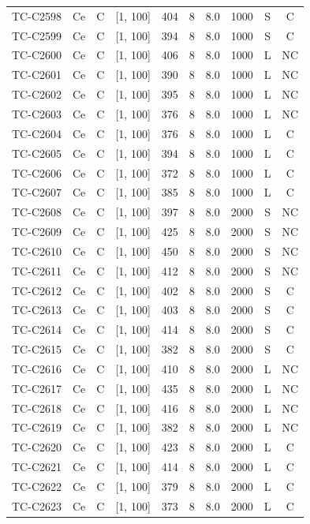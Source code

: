 \begin{longtable}{lccccccccc}
TC-C2598 & Ce & C & [1, 100] & 404 & 8 & 8.0 & 1000 & S & C \\
TC-C2599 & Ce & C & [1, 100] & 394 & 8 & 8.0 & 1000 & S & C \\
TC-C2600 & Ce & C & [1, 100] & 406 & 8 & 8.0 & 1000 & L & NC \\
TC-C2601 & Ce & C & [1, 100] & 390 & 8 & 8.0 & 1000 & L & NC \\
TC-C2602 & Ce & C & [1, 100] & 395 & 8 & 8.0 & 1000 & L & NC \\
TC-C2603 & Ce & C & [1, 100] & 376 & 8 & 8.0 & 1000 & L & NC \\
TC-C2604 & Ce & C & [1, 100] & 376 & 8 & 8.0 & 1000 & L & C \\
TC-C2605 & Ce & C & [1, 100] & 394 & 8 & 8.0 & 1000 & L & C \\
TC-C2606 & Ce & C & [1, 100] & 372 & 8 & 8.0 & 1000 & L & C \\
TC-C2607 & Ce & C & [1, 100] & 385 & 8 & 8.0 & 1000 & L & C \\
TC-C2608 & Ce & C & [1, 100] & 397 & 8 & 8.0 & 2000 & S & NC \\
TC-C2609 & Ce & C & [1, 100] & 425 & 8 & 8.0 & 2000 & S & NC \\
TC-C2610 & Ce & C & [1, 100] & 450 & 8 & 8.0 & 2000 & S & NC \\
TC-C2611 & Ce & C & [1, 100] & 412 & 8 & 8.0 & 2000 & S & NC \\
TC-C2612 & Ce & C & [1, 100] & 402 & 8 & 8.0 & 2000 & S & C \\
TC-C2613 & Ce & C & [1, 100] & 403 & 8 & 8.0 & 2000 & S & C \\
TC-C2614 & Ce & C & [1, 100] & 414 & 8 & 8.0 & 2000 & S & C \\
TC-C2615 & Ce & C & [1, 100] & 382 & 8 & 8.0 & 2000 & S & C \\
TC-C2616 & Ce & C & [1, 100] & 410 & 8 & 8.0 & 2000 & L & NC \\
TC-C2617 & Ce & C & [1, 100] & 435 & 8 & 8.0 & 2000 & L & NC \\
TC-C2618 & Ce & C & [1, 100] & 416 & 8 & 8.0 & 2000 & L & NC \\
TC-C2619 & Ce & C & [1, 100] & 382 & 8 & 8.0 & 2000 & L & NC \\
TC-C2620 & Ce & C & [1, 100] & 423 & 8 & 8.0 & 2000 & L & C \\
TC-C2621 & Ce & C & [1, 100] & 414 & 8 & 8.0 & 2000 & L & C \\
TC-C2622 & Ce & C & [1, 100] & 379 & 8 & 8.0 & 2000 & L & C \\
TC-C2623 & Ce & C & [1, 100] & 373 & 8 & 8.0 & 2000 & L & C \\

\end{longtable}
